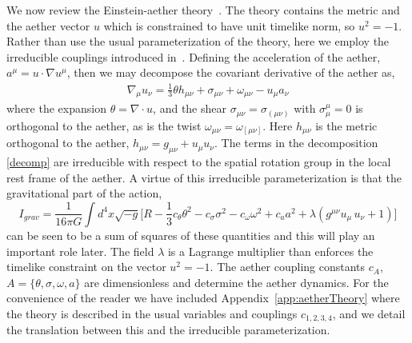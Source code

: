 \documentclass[12pt]{article}
\numberwithin{equation}{section}
\begin{document}
We now review the Einstein-aether theory~\cite{Jacobson:2004ts}. The theory contains the metric and the aether vector $u$ which is constrained to have unit timelike norm, so $u^2 = -1$. 
Rather than use the usual parameterization of the theory, here we employ the irreducible couplings
introduced in~\cite{Jacobson:2013xta}. 
Defining the acceleration of the aether, $a^\mu = u \cdot \nabla u^\mu$, then we may decompose the covariant derivative of the aether as,
\begin{eqnarray}\label{decomp}
\nabla_\mu u_\nu  = \frac{1}{3} \theta h_{\mu\nu} + \sigma_{\mu\nu} + \omega_{\mu\nu} - u_\mu a_\nu
\end{eqnarray}
where the expansion $\theta = \nabla \cdot u$, and the shear $\sigma_{\mu\nu} = \sigma_{(\mu\nu)}$ with $\sigma^\mu_\mu = 0$ is orthogonal to the aether, as is the twist $\omega_{\mu\nu} = \omega_{[\mu\nu]}$. Here $h_{\mu\nu}$ is the metric orthogonal to the aether, $h_{\mu\nu} = g_{\mu\nu} + u_\mu u_\nu$. 
The terms in the decomposition \eqref{decomp} are irreducible with respect to the spatial rotation group  
in the local rest frame of the aether.
A virtue of this irreducible
parameterization is that the gravitational part of the action, 
\begin{equation}
\label{eq:action}
I_{grav} = \frac{1}{16 \pi G}\int d^4x\sqrt{-g}\bigg[R - \frac{1}{3} c_\theta \theta^2 - c_\sigma \sigma^2 - c_\omega \omega^2 + c_a a^2 + {\lambda} (g^{\mu\nu}u_\mu\,u_\nu+1)\bigg]
\end{equation}
can be seen to be a sum of squares of these quantities and this will play an important role later. 
The field $\lambda$ is a Lagrange multiplier than enforces the timelike constraint on the vector $u^2 = -1$. The aether coupling constants
$c_A$, $A = \{ \theta, \sigma, \omega, a \}$ are dimensionless and determine the aether dynamics. For the convenience of the reader we have included Appendix~\ref{app:aetherTheory} where the theory is described in the usual variables and couplings $c_{1,2,3,4}$, and we detail the translation between this and the irreducible parameterization.
\end{document}
